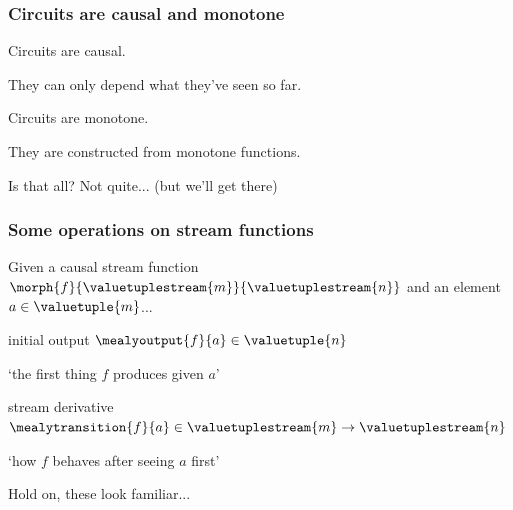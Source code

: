 \begin{frame}
    \frametitle{Circuits are causal and monotone}

    \pause
    \Large
    Circuits are \alert{causal}.

    \pause

    \normalsize
    They can only depend \alert{what they've seen so far}.

    \pause

    \Large
    Circuits are \alert{monotone}.

    \pause

    \normalsize
    They are constructed from \alert{monotone functions}.

    \pause

    Is that all?
    \pause
    \alert{Not quite...}
    \pause
    (but we'll get there)


\end{frame}
\begin{frame}
    \frametitle{Some operations on stream functions}

    Given a causal stream function \(
        \morph{f}{\valuetuplestream{m}}{\valuetuplestream{n}}
    \) and an element \(a \in \valuetuple{m}\)...

    \pause

    \Large
    \alert{initial output} \quad
    \(\mealyoutput{f}{a} \in \valuetuple{n}\)

    \pause

    \normalsize
    `the first thing \(f\) produces given \(a\)'

    \pause

    \Large
    \alert{stream derivative} \quad
    \(\mealytransition{f}{a} \in \valuetuplestream{m} \to \valuetuplestream{n}\)

    \pause

    \normalsize
    `how \(f\) behaves after seeing \(a\) first'

    \vspace{1em}

    \pause
    Hold on, these look familiar...

\end{frame}
